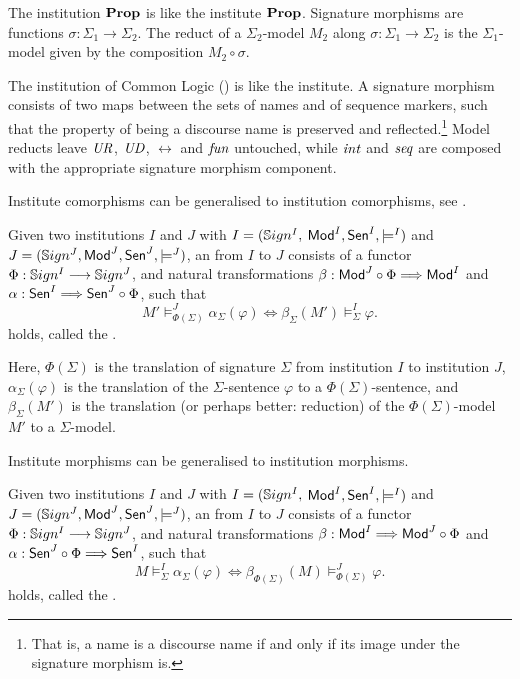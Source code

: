\documentclass[10pt,%
\ifpretendfinal
final%
\else
draft%
\fi,
]{scrreprt}
\begin{document}
\begin{definition}\label{Prop}
The institution $\mathbf{Prop}$ is like the institute $\mathbf{Prop}$.
Signature morphisms are functions
$\sigma:{\Sigma_1}\to{\Sigma_2}$. The reduct of a $\Sigma_2$-model
$M_2$ along $\sigma:{\Sigma_1}\to{\Sigma_2}$ is the $\Sigma_1$-model
given by the composition $M_2\circ\sigma$. 
\end{definition}

\begin{definition}\label{CommonLogic}
The institution of Common Logic (\Clogic) is like the institute.
A \Clogic signature morphism consists of two maps
between the sets of names and of sequence markers, such that the property of being a discourse name
is preserved and reflected.\footnote{That is, a name is a discourse
name if and only if its image under the signature morphism is.}  
 Model reducts leave $\mathit{UR}$, $\mathit{UD}$, $\rel$ and $\mathit{fun}$
untouched, while $\mathit{int}$ and $\mathit{seq}$ are composed with the appropriate
signature morphism component.
\end{definition}
%

Institute comorphisms can be generalised to institution comorphisms,
see \cite{inst-mor}.  

\begin{definition} Given two institutions $I$ and $J$ with $I = (\mathbb{S}ign^I,$ $ \mathsf{Mod}^I, \mathsf{Sen}^I, \models^I)$ and $J = (\mathbb{S}ign^J, \mathsf{Mod}^J,
\mathsf{Sen}^J, \models^J)$, an  from $I$ to
$J$ consists of a functor $\Phi : \mathbb{S}ign^I \longrightarrow \mathbb{S}ign^J$, and
natural transformations $\beta: \mathsf{Mod}^J \circ \Phi \Longrightarrow \mathsf{Mod}^I$
and $\alpha: \mathsf{Sen}^I \Longrightarrow \mathsf{Sen}^J \circ \Phi$, such that 
$$ M'\models^{J}_{\Phi(\Sigma)}\alpha_{\Sigma}(\varphi) \Leftrightarrow
\beta_{\Sigma}(M')\models^I_{\Sigma}\varphi.
$$
holds, called the .
\end{definition}

\noindent
Here, $\Phi(\Sigma)$ is the translation of signature $\Sigma$ from
institution $I$ to institution $J$, $\alpha_{\Sigma}(\varphi)$ is the
translation of the $\Sigma$-sentence $\varphi$ to a
$\Phi(\Sigma)$-sentence, and $\beta_{\Sigma}(M')$ is the translation
(or perhaps better: reduction) of the $\Phi(\Sigma)$-model $M'$ to a
$\Sigma$-model.

Institute morphisms can be generalised to institution morphisms.

\begin{definition} Given two institutions $I$ and $J$ with $I = (\mathbb{S}ign^I,$ $ \mathsf{Mod}^I, \mathsf{Sen}^I, \models^I)$ and $J = (\mathbb{S}ign^J, \mathsf{Mod}^J,
\mathsf{Sen}^J, \models^J)$, an  from $I$ to
$J$ consists of a functor $\Phi : \mathbb{S}ign^I \longrightarrow \mathbb{S}ign^J$, and
natural transformations $\beta: \mathsf{Mod}^I \Longrightarrow \mathsf{Mod}^J \circ \Phi$
and $\alpha:  \mathsf{Sen}^J \circ \Phi \Longrightarrow \mathsf{Sen}^I $, such that 
$$ M\models^{I}_{\Sigma}\alpha_{\Sigma}(\varphi) \Leftrightarrow
\beta_{\Phi(\Sigma)}(M)\models^J_{\Phi(\Sigma)}\varphi.
$$
holds, called the .
\end{definition}
\end{document}
